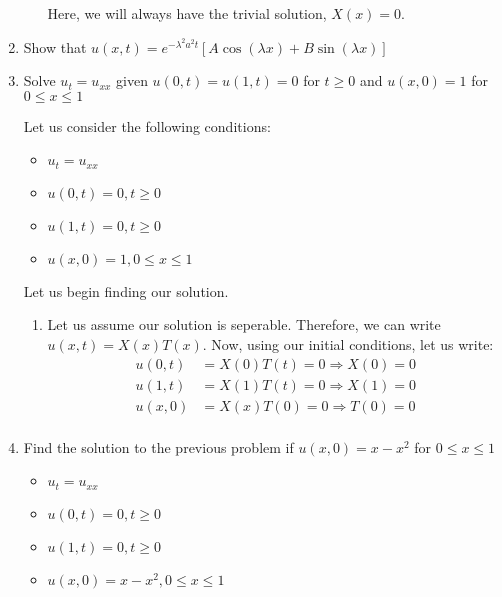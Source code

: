 \documentclass{article}
\begin{document}
\begin{enumerate}
\begin{enumerate}
  Here, we will always have the trivial solution, $X(x) = 0$.

\end{enumerate}
%
%
\newpage
%
%
  \item Show that $u(x, t) = e^{-\lambda^2 a^2 t}\left[ A \cos(\lambda x) + B \sin(\lambda x) \right]$
%



%
%
\newpage
%
%
  \item Solve $u_t = u_{xx}$ given $u(0, t) = u(1, t) = 0$ for $t \geq 0$ and $u(x, 0) = 1$ for $0 \leq x \leq 1$
%
%

Let us consider the following conditions:
%
\begin{itemize}
  \item $u_t = u_{xx}$
  \item $u(0, t) = 0, t \geq 0$
  \item $u(1, t) = 0, t \geq 0$
  \item $u(x, 0) = 1, 0 \leq x \leq 1$
\end{itemize}

Let us begin finding our solution.
\begin{enumerate}
  \item Let us assume our solution is seperable. Therefore, we can write $u(x, t) = X(x)T(x)$. Now, using our initial conditions, let us write:
  \begin{align}
    u(0, t) & = X(0)T(t) = 0 \Rightarrow X(0) = 0\\
    u(1, t) & = X(1)T(t) = 0 \Rightarrow X(1) = 0\\
    u(x, 0) & = X(x)T(0) = 0 \Rightarrow T(0) = 0\\
  \end{align}
\end{enumerate}
%
%
\item Find the solution to the previous problem if $u(x, 0) = x - x^2$ for $0 \leq x \leq 1$

\begin{itemize}
  \item $u_t = u_{xx}$
  \item $u(0, t) = 0, t \geq 0$
  \item $u(1, t) = 0, t \geq 0$
  \item $u(x, 0) = x - x^2, 0 \leq x \leq 1$
\end{itemize}


\end{enumerate}
\end{document}
